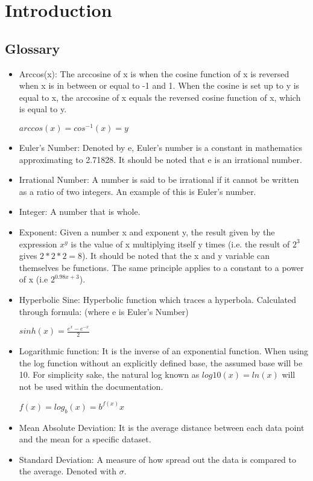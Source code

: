 \section{Introduction}
    \subsection{Glossary}
        \begin{itemize}
            \item Arccos(x): The arccosine of x is when the cosine function of x is reversed when x is in between or equal to -1 and 1. When the cosine is set up to y is equal to x, the arccosine of x equals the reversed cosine function of x, which is equal to y. \cite{arccos}
            \begin{center}
                $arccos(x) = cos^{-1}(x) = y$
            \end{center}
            \item Euler’s Number: Denoted by e, Euler’s number is a constant in mathematics approximating to 2.71828. It should be noted that e is an irrational number.\cite{boundless}
            \item Irrational Number: A number is said to be irrational if it cannot be written as a ratio of two integers. An example of this is Euler’s number. \cite{wolfram}
            \item Integer: A number that is whole. \cite{merriam}
            \item Exponent: Given a number x and exponent y, the result given by the expression $x^y$ is the value of x multiplying itself y times (i.e. the result of $2^3$ gives $2 * 2 * 2 = 8$). It should be noted that the x and y variable can themselves be functions. The same principle applies to a constant to a power of x (i.e $2^{0.98x+3}$).
            \item Hyperbolic Sine: Hyperbolic function which traces a hyperbola. Calculated through formula: (where e is Euler’s Number) \cite{encyclopaedia}
            \begin{center}
                $sinh(x) =  \frac{e^x - e^{-x}} {2}$
            \end{center}
            \item Logarithmic function: It is the inverse of an exponential function. When using the log function without an explicitly defined base, the assumed base will be 10. For simplicity sake, the natural log known as $log10(x) = ln(x)$ will not be used within the documentation.\cite{dawkins}
            \begin{center}
                $f(x) = log_b(x) = b^{f(x)}x$
            \end{center}
            \item  Mean Absolute Deviation: It is the average distance between each data point and the mean for a specific dataset. \cite{khan}
            \item Standard Deviation: A measure of how spread out the data is compared to the average. Denoted with $\sigma$. \cite{students}
        \end{itemize}


